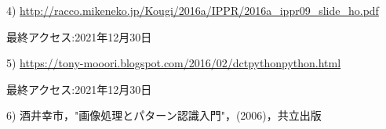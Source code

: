 \documentclass[uplatex,dvipdfmx,ja=standard]{bxjsarticle}
\begin{document}
4) \url{http://racco.mikeneko.jp/Kougi/2016a/IPPR/2016a_ippr09_slide_ho.pdf}

最終アクセス:2021年12月30日

5) \url{https://tony-mooori.blogspot.com/2016/02/dctpythonpython.html}

最終アクセス:2021年12月30日

6) 酒井幸市，"画像処理とパターン認識入門"，(2006)，共立出版 





%
%


%
%
\end{document}
